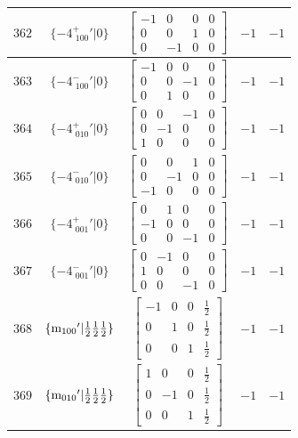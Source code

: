 \documentclass[fleqn,8pt]{jsarticle}
\begin{document}
\begin{longtable}{ccccc}
$ 362 $ & $ \{-4^{+}_{\,\,100}{}'|0\} $ & $ \begin{bmatrix} -1 & 0 & 0 & 0 \\ 0 & 0 & 1 & 0 \\ 0 & -1 & 0 & 0 \end{bmatrix} $ & $ -1 $ & $ -1 $ \\ \hline
$ 363 $ & $ \{-4^{-}_{\,\,100}{}'|0\} $ & $ \begin{bmatrix} -1 & 0 & 0 & 0 \\ 0 & 0 & -1 & 0 \\ 0 & 1 & 0 & 0 \end{bmatrix} $ & $ -1 $ & $ -1 $ \\ \hline
$ 364 $ & $ \{-4^{+}_{\,\,010}{}'|0\} $ & $ \begin{bmatrix} 0 & 0 & -1 & 0 \\ 0 & -1 & 0 & 0 \\ 1 & 0 & 0 & 0 \end{bmatrix} $ & $ -1 $ & $ -1 $ \\ \hline
$ 365 $ & $ \{-4^{-}_{\,\,010}{}'|0\} $ & $ \begin{bmatrix} 0 & 0 & 1 & 0 \\ 0 & -1 & 0 & 0 \\ -1 & 0 & 0 & 0 \end{bmatrix} $ & $ -1 $ & $ -1 $ \\ \hline
$ 366 $ & $ \{-4^{+}_{\,\,001}{}'|0\} $ & $ \begin{bmatrix} 0 & 1 & 0 & 0 \\ -1 & 0 & 0 & 0 \\ 0 & 0 & -1 & 0 \end{bmatrix} $ & $ -1 $ & $ -1 $ \\ \hline
$ 367 $ & $ \{-4^{-}_{\,\,001}{}'|0\} $ & $ \begin{bmatrix} 0 & -1 & 0 & 0 \\ 1 & 0 & 0 & 0 \\ 0 & 0 & -1 & 0 \end{bmatrix} $ & $ -1 $ & $ -1 $ \\ \hline
$ 368 $ & $ \{{\rm m}_{100}{}'|\frac{1}{2} \frac{1}{2} \frac{1}{2}\} $ & $ \begin{bmatrix} -1 & 0 & 0 & \frac{1}{2} \\ 0 & 1 & 0 & \frac{1}{2} \\ 0 & 0 & 1 & \frac{1}{2} \end{bmatrix} $ & $ -1 $ & $ -1 $ \\ \hline
$ 369 $ & $ \{{\rm m}_{010}{}'|\frac{1}{2} \frac{1}{2} \frac{1}{2}\} $ & $ \begin{bmatrix} 1 & 0 & 0 & \frac{1}{2} \\ 0 & -1 & 0 & \frac{1}{2} \\ 0 & 0 & 1 & \frac{1}{2} \end{bmatrix} $ & $ -1 $ & $ -1 $ \\ \hline

\end{longtable}
\end{document}
